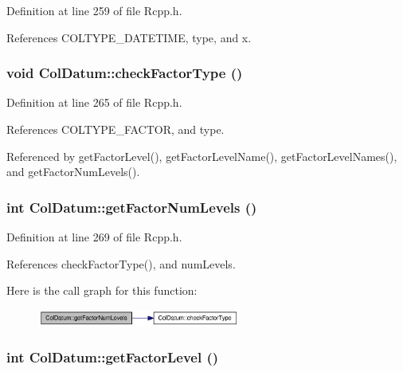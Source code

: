 Definition at line 259 of file Rcpp.h.

References COLTYPE\_\-DATETIME, type, and x.\hypertarget{classColDatum_9d151a64fb91608752346a9a16551410}{
\subsubsection[checkFactorType]{\setlength{\rightskip}{0pt plus 5cm}void ColDatum::checkFactorType ()}}
\label{classColDatum_9d151a64fb91608752346a9a16551410}




Definition at line 265 of file Rcpp.h.

References COLTYPE\_\-FACTOR, and type.

Referenced by getFactorLevel(), getFactorLevelName(), getFactorLevelNames(), and getFactorNumLevels().\hypertarget{classColDatum_9b5db8254be428e68c61805f02723821}{
\subsubsection[getFactorNumLevels]{\setlength{\rightskip}{0pt plus 5cm}int ColDatum::getFactorNumLevels ()}}
\label{classColDatum_9b5db8254be428e68c61805f02723821}




Definition at line 269 of file Rcpp.h.

References checkFactorType(), and numLevels.

Here is the call graph for this function:\nopagebreak
\begin{figure}[H]
\begin{center}
\leavevmode
\includegraphics[width=189pt]{classColDatum_9b5db8254be428e68c61805f02723821_cgraph}
\end{center}
\end{figure}
\hypertarget{classColDatum_df3716db9f3483f3cd255a4c05823479}{
\subsubsection[getFactorLevel]{\setlength{\rightskip}{0pt plus 5cm}int ColDatum::getFactorLevel ()}}
\label{classColDatum_df3716db9f3483f3cd255a4c05823479}





